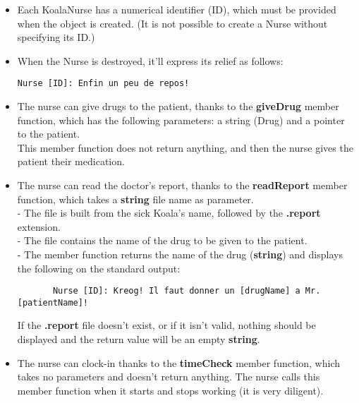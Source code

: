 \begin{itemize}

  \item Each KoalaNurse has a numerical identifier (ID), which must be provided
    when the object is created. (It is not possible to create a Nurse without
    specifying its ID.)

  \item When the Nurse is destroyed, it'll express its relief as follows:
    \begin{lstlisting}
Nurse [ID]: Enfin un peu de repos!
    \end{lstlisting}

  \item The nurse can give drugs to the patient, thanks to the \textbf{giveDrug}
    member function, which has the following parameters: a string (Drug) and a
    pointer to the patient.\\
    This member function does not return anything, and then the nurse gives the
    patient their medication.\\

  \item The nurse can read the doctor's report, thanks to the \textbf{readReport}
    member function, which takes a \textbf{string} file name as parameter.\\

    - The file is built from the sick Koala's name, followed by the \textbf{.report}
    extension.\\
    - The file contains the name of the drug to be given to the patient.\\
    - The member function returns the name of the drug (\textbf{string}) and
    displays the following on the standard output:
    \begin{lstlisting}
       Nurse [ID]: Kreog! Il faut donner un [drugName] a Mr.[patientName]!
    \end{lstlisting}

    If the \textbf{.report} file doesn't exist, or if it isn't valid, nothing should
    be displayed and the return value will be an empty \textbf{string}.\\

  \item The nurse can clock-in thanks to the \textbf{timeCheck} member function,
    which takes no parameters and doesn't return anything. The nurse calls this
    member function when it starts and stops working (it is very diligent).\\


\end{itemize}
